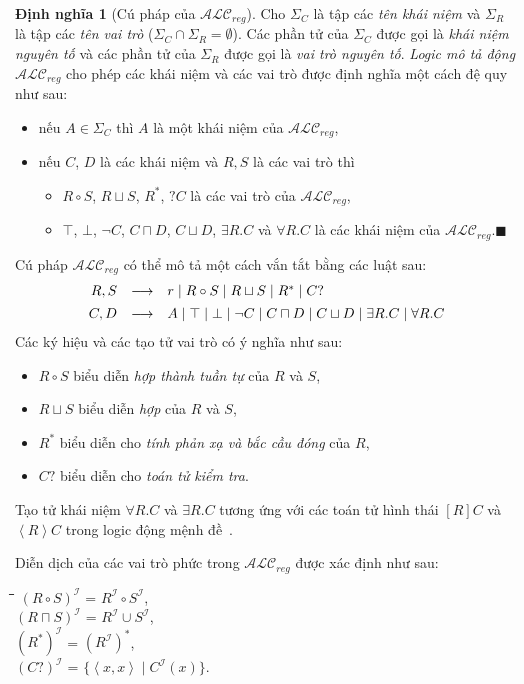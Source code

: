 \documentclass[12pt,a4paper,twoside]{report}
\newcommand{\mI}		{\mathcal{I}}
\newcommand{\SigmaC}	{\Sigma_C}
\newcommand{\SigmaR}	{\Sigma_R}
\newcommand{\ALCreg}	{$\mathcal{ALC}_{reg}$\xspace}
\newcommand{\myend}		{\mbox{}\hfill\mbox{{\scriptsize$\!\blacksquare$}}}
\newcommand{\tuple}[1]	{\left\langle#1\right\rangle\!}
\newcommand{\mand}		{\sqcap}
\newcommand{\mor}		{\sqcup}
\newcommand{\V}			{\forall}
\newcommand{\E}			{\exists}
\theoremstyle{definition}
\newtheorem{Definition}{Định nghĩa}[chapter]
\begin{document}
\begin{Definition}[Cú pháp của \ALCreg]
\label{def:ALCRegSyntax}
Cho $\SigmaC$ là tập các {\em tên khái niệm} và $\SigmaR$ là tập các {\em tên vai trò} ($\SigmaC \cap \SigmaR = \emptyset$). Các phần tử của $\SigmaC$ được gọi là {\em khái niệm nguyên tố} và các phần tử của $\SigmaR$ được gọi là {\em vai trò nguyên tố}. {\em Logic mô tả động} \ALCreg cho phép các khái niệm và các vai trò được định nghĩa một cách đệ quy như sau:

\begin{itemize}
  \item nếu $A \in \SigmaC$ thì $A$ là một khái niệm của \ALCreg,
  \item nếu $C$, $D$ là các khái niệm và $R, S$ là các vai trò thì 
  \begin{itemize}
     \item $R \circ S$, $R \mor S$, $R^*$, $?C$ là các vai trò của \ALCreg,
     \item $\top$, $\bot$, $\neg C$, $C \mand D$, $C \mor D$, $\E R.C$ và $\V R.C$ là các khái niệm của \ALCreg.\myend
  \end{itemize}
\end{itemize}
\end{Definition}
%
\noindent
Cú pháp \ALCreg có thể mô tả một cách vắn tắt bằng các luật sau:
\[
\begin{array}{r c l}
R, S & \longrightarrow &
  r \mid 
  R \circ S \mid
  R \mor S \mid
  R^* \mid
  C?\\[1ex]
C, D & \longrightarrow&
  A \mid 
  \top \mid 
  \bot \mid 
  \neg C \mid 
  C\mand D \mid 
  C \mor D \mid 
  \E R.C \mid
  \V R.C
\end{array}
\]
%
Các ký hiệu và các tạo tử vai trò có ý nghĩa như sau:
\begin{itemize}
  \item $R \circ S$ biểu diễn {\em hợp thành tuần tự} của $R$ và $S$,
  \item $R \mor S$ biểu diễn {\em hợp} của $R$ và $S$,
  \item $R^*$ biểu diễn cho {\em tính phản xạ và bắc cầu đóng} của $R$,
  \item $C?$ biểu diễn cho {\em toán tử kiểm tra}.
\end{itemize}

Tạo tử khái niệm $\V R.C$ và $\E R.C$ tương ứng với các toán tử hình thái $[R]C$ và $\tuple{R}C$ trong logic động mệnh đề~\cite{Nguyen2013}.

Diễn dịch của các vai trò phức trong \ALCreg được xác định như sau:
\begin{tabbing}
  \hspace*{.85cm}\=\hspace*{1.8cm}\=\hspace*{0.5cm}\=\hspace*{\textwidth}\=\kill
    \> $(R \circ S)^\mI$ \> = \> $R^\mI \circ S^\mI$, \\[0.5ex]
    \> $(R \mand S)^\mI$ \> = \> $R^\mI \cup S^\mI$, \\[0.5ex]
    \> $(R^*)^\mI$ \> = \> $(R^\mI)^*$, \\[0.5ex]
    \> $(C?)^\mI$ \> = \> $\{\tuple{x,x} \mid C^\mI(x)\}$.
\end{tabbing}
\end{document}

